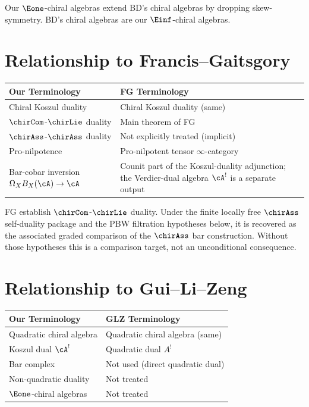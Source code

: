 \begin{remark}
Our $\Eone$-chiral algebras extend BD's chiral algebras by dropping skew-symmetry. BD's chiral algebras are our $\Einf$-chiral algebras.
\end{remark}

\section{Relationship to Francis--Gaitsgory}

\begin{tabular}{>{\raggedright\arraybackslash}p{}>{\raggedright\arraybackslash}p{}}
\textbf{Our Terminology} & \textbf{FG Terminology} \\
\hline
Chiral Koszul duality & Chiral Koszul duality (same) \\
$\chirCom$-$\chirLie$ duality & Main theorem of FG \\
$\chirAss$-$\chirAss$ duality & Not explicitly treated (implicit) \\
Pro-nilpotence & Pro-nilpotent tensor $\infty$-category \\
Bar-cobar inversion $\Omega_XB_X(\cA)\to\cA$ & Counit part of the
Koszul-duality adjunction; the Verdier-dual algebra $\cA^!$ is a
separate output \\
\end{tabular}

\begin{remark}
FG establish $\chirCom$-$\chirLie$ duality. Under the finite locally
free $\chirAss$ self-duality package and the PBW filtration hypotheses
below, it is recovered as the associated graded comparison of the
$\chirAss$ bar construction. Without those hypotheses this is a
comparison target, not an unconditional consequence.
\end{remark}

\section{Relationship to Gui--Li--Zeng}

\begin{tabular}{>{\raggedright\arraybackslash}p{}>{\raggedright\arraybackslash}p{}}
\textbf{Our Terminology} & \textbf{GLZ Terminology} \\
\hline
Quadratic chiral algebra & Quadratic chiral algebra (same) \\
Koszul dual $\cA^!$ & Quadratic dual $A^!$ \\
Bar complex & Not used (direct quadratic dual) \\
Non-quadratic duality & Not treated \\
$\Eone$-chiral algebras & Not treated \\
\end{tabular}

